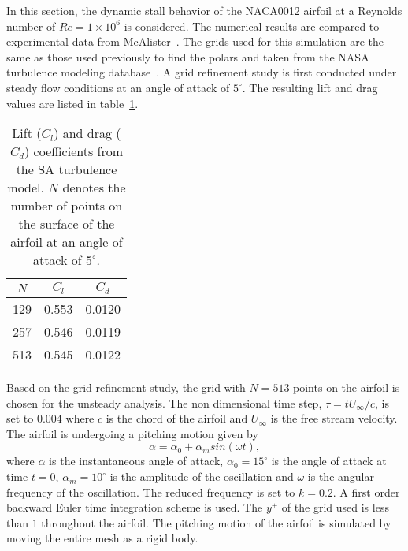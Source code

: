 In this section, the dynamic stall behavior of the NACA0012 airfoil at a Reynolds number of $Re=1\times10^6$ is considered. The numerical results are compared to experimental data from McAlister~\cite{mcalister1978dynamic}. The grids used for this simulation are the same as those used previously to find the polars and taken from the NASA turbulence modeling database~\cite{NASATMR}. A grid refinement study is first conducted under steady flow conditions at an angle of attack of $5^{\circ}$. The resulting lift and drag values are listed in table~\ref{tab:re1e62gridref}.
\begin{table}[h!]
\centering
\captionsetup{justification=centering}
\begin{tabular}{ |c|c|c| } 
\hline
 $N$ & $C_l$ & $C_d$ \\
\hline
129& 0.553& 0.0120\\
\hline
257& 0.546& 0.0119\\
\hline
513& 0.545& 0.0122\\
\hline
\end{tabular}
\caption{Lift ($C_l$) and drag ($C_d$) coefficients from the SA turbulence model. $N$ denotes the number of points on the surface of the airfoil at an angle of attack of $5^{\circ}$.}
\label{tab:re1e62gridref}
\end{table}
Based on the grid refinement study, the grid with $N=513$ points on the airfoil is chosen for the unsteady analysis. The non dimensional time step, $\tau = tU_{\infty}/c$, is set to $0.004$ where $c$ is the chord of the airfoil and $U_{\infty}$ is the free stream velocity. The airfoil is undergoing a pitching motion given by
\begin{equation}
\alpha = \alpha_0 + \alpha_m sin(\omega t),
\end{equation}
where $\alpha$ is the instantaneous angle of attack, $\alpha_0=15^{\circ}$ is the angle of attack at time $t=0$, $\alpha_m=10^{\circ}$ is the amplitude of the oscillation and $\omega$ is the angular frequency of the oscillation. 
The reduced frequency is set to $k=0.2$. A first order backward Euler time integration scheme is used. The $y^+$ of the grid used is less than $1$ throughout the airfoil. The pitching motion of the airfoil is simulated by moving the entire mesh as a rigid body.

